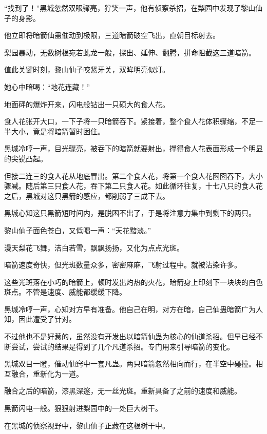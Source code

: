 
\begin{this_body}



“找到了！”黑城忽然双眼骤亮，狞笑一声，他有侦察杀招，在梨园中发现了黎山仙子的身影。

他立即将暗箭仙蛊催动到极限，三道暗箭破空飞出，直朝目标射去。

梨园暴动，无数树根宛若虬龙一般，探出、延伸、翻腾，拼命阻截这三道暗箭。

值此关键时刻，黎山仙子咬紧牙关，双眸明亮似灯。

她心中暗喝：“地花连藏！”

地面砰的爆炸开来，闪电般钻出一只硕大的食人花。

食人花张开大口，一下子将一只暗箭吞下。紧接着，整个食人花体积骤缩，不足一半大小，竟是将暗箭暂时困住。

黑城冷哼一声，目光骤亮，被吞下的暗箭就要射出，撑得食人花表面形成一个明显的尖锐凸起。

但接二连三的食人花从地底冒出。第二个食人花，将第一个食人花囫囵吞下，大小骤减。随后第三只食人花，吞下第二只食人花。如此循环往复，十七八只的食人花之后，黑城对这只黑箭的感应，都削弱了三成下去。

黑城心知这只黑箭短时间内，是脱困不出了，于是将注意力集中到剩下的两只。

黎山仙子面色苍白，又低喝一声：“天花黯淡。”

漫天梨花飞舞，洁白若雪，飘飘扬扬，又化为点点光斑。

暗箭速度奇快，但光斑数量众多，密密麻麻，飞射过程中。就被沾染许多。

这些光斑落在小巧的暗箭上，顿时发出灼热的火花，暗箭身上印刻下一块块的白色斑点。不管是速度、威能都缓缓下降。

黑城冷哼一声，心知对方早有准备。他自己在明，对方在暗，自己仙蛊暗箭广为人知，因此遭受了针对。

不过他也不是好惹的，虽然没有开发出以暗箭仙蛊为核心的仙道杀招。但早已经不断尝试，尝试的结果是得到了几个凡道杀招。专门用来引导暗箭的变化。

黑城双目一瞪，催动仙窍中一套凡蛊。两只暗箭忽然相向而行，在半空中碰撞。相互融合，重新化为一道。

融合之后的暗箭，漆黑深邃，无一丝光斑。重新具备了之前的速度和威能。

黑箭闪电一般。狠狠射进梨园中的一处巨大树干。

在黑城的侦察视野中，黎山仙子正藏在这根树干中。


\end{this_body}
